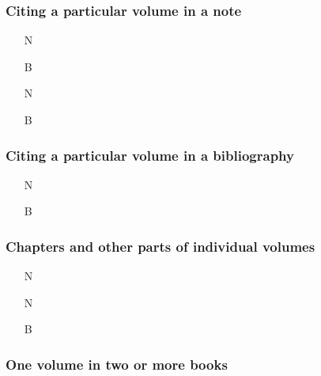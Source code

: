 \documentclass[11pt,letterpaper,oneside]{article}
\begin{document}
\subsubsection{Citing a particular volume in a note}
\label{14.123}

\begin{itemize}
\item[N] 

\item[B] 

\item[N] 

\item[B] 
\end{itemize}

\subsubsection{Citing a particular volume in a bibliography}
\label{14.124}

\begin{itemize}
\item[N] 

\item[B] 
\end{itemize}

\subsubsection{Chapters and other parts of individual volumes}
\label{14.125}

\begin{itemize}
\item[N] 

\item[N] 

\item[B] 
\end{itemize}

\subsubsection{One volume in two or more books}
\label{14.126}

\end{document}
